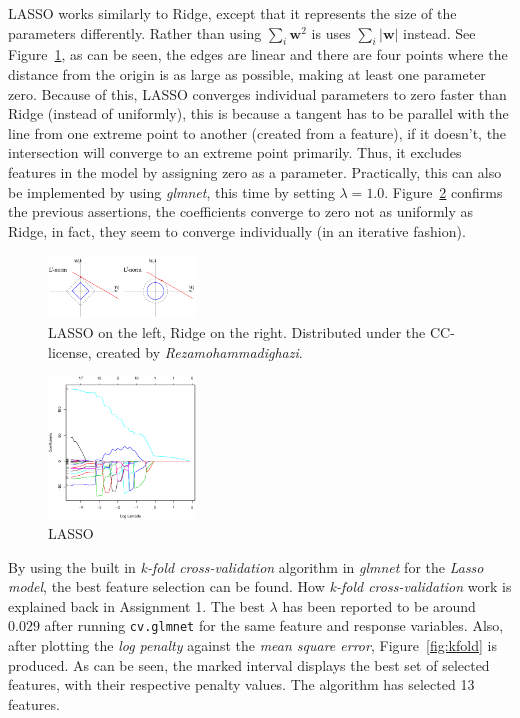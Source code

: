 \documentclass[a4paper, twocolumn]{article}
\begin{document}
        LASSO works similarly to Ridge, except that it represents the size of the parameters differently. Rather than using $\sum_{i}{\mathbf{w}^2}$ is uses $\sum_{i}{|\mathbf{w}|}$ instead. See Figure~\ref{fig:shape}, as can be seen, the edges are linear and there are four points where the distance from the origin is as large as possible, making at least one parameter zero. Because of this, LASSO converges individual parameters to zero faster than Ridge (instead of uniformly), this is because a tangent has to be parallel with the line from one extreme point to another (created from a feature), if it doesn't, the intersection will converge to an extreme point primarily. Thus, it excludes features in the model by assigning zero as a parameter. Practically, this can also be implemented by using \emph{glmnet}, this time by setting $\lambda = 1.0$. Figure~\ref{fig:lasso} confirms the previous assertions, the coefficients converge to zero not as uniformly as Ridge, in fact, they seem to converge individually (in an iterative fashion).

    \begin{figure}[h!]
        \centering
        \caption{LASSO on the left, Ridge on the right. Distributed under the CC-license, created by \emph{Rezamohammadighazi}.}
        \label{fig:shape}
        \includegraphics[width=0.35\textwidth]{share/shape.jpg}
    \end{figure}

    \begin{figure}[h!]
        \centering
        \caption{LASSO}
        \label{fig:lasso}
        \includegraphics[width=0.35\textwidth]{share/lasso.eps}
    \end{figure}

        By using the built in \emph{k-fold cross-validation} algorithm in \emph{glmnet} for the \emph{Lasso model}, the best feature selection can be found. How \emph{k-fold cross-validation} work is explained back in Assignment 1. The best $\lambda$ has been reported to be around $0.029$ after running \texttt{cv.glmnet} for the same feature and response variables. Also, after plotting the \emph{log penalty} against the \emph{mean square error}, Figure~\ref{fig:kfold} is produced. As can be seen, the marked interval displays the best set of selected features, with their respective penalty values. The algorithm has selected 13 features.
\end{document}
